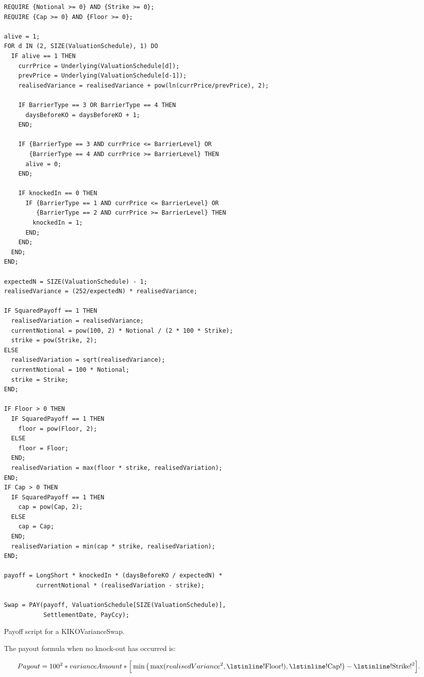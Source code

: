 \begin{listing}[hbt]
\begin{verbatim}
REQUIRE {Notional >= 0} AND {Strike >= 0};
REQUIRE {Cap >= 0} AND {Floor >= 0};

alive = 1;
FOR d IN (2, SIZE(ValuationSchedule), 1) DO
  IF alive == 1 THEN
    currPrice = Underlying(ValuationSchedule[d]);
    prevPrice = Underlying(ValuationSchedule[d-1]);
    realisedVariance = realisedVariance + pow(ln(currPrice/prevPrice), 2);

    IF BarrierType == 3 OR BarrierType == 4 THEN
      daysBeforeKO = daysBeforeKO + 1;
    END;

    IF {BarrierType == 3 AND currPrice <= BarrierLevel} OR
       {BarrierType == 4 AND currPrice >= BarrierLevel} THEN
      alive = 0;
    END;

    IF knockedIn == 0 THEN
      IF {BarrierType == 1 AND currPrice <= BarrierLevel} OR
         {BarrierType == 2 AND currPrice >= BarrierLevel} THEN
        knockedIn = 1;
      END;
    END;
  END;
END;

expectedN = SIZE(ValuationSchedule) - 1;
realisedVariance = (252/expectedN) * realisedVariance;

IF SquaredPayoff == 1 THEN
  realisedVariation = realisedVariance;
  currentNotional = pow(100, 2) * Notional / (2 * 100 * Strike);
  strike = pow(Strike, 2);
ELSE
  realisedVariation = sqrt(realisedVariance);
  currentNotional = 100 * Notional;
  strike = Strike;
END;

IF Floor > 0 THEN
  IF SquaredPayoff == 1 THEN
    floor = pow(Floor, 2);
  ELSE
    floor = Floor;
  END;
  realisedVariation = max(floor * strike, realisedVariation);
END;
IF Cap > 0 THEN
  IF SquaredPayoff == 1 THEN
    cap = pow(Cap, 2);
  ELSE
    cap = Cap;
  END;
  realisedVariation = min(cap * strike, realisedVariation);
END;

payoff = LongShort * knockedIn * (daysBeforeKO / expectedN) *
         currentNotional * (realisedVariation - strike);

Swap = PAY(payoff, ValuationSchedule[SIZE(ValuationSchedule)],
           SettlementDate, PayCcy);
\end{verbatim}
\caption{Payoff script for a KIKOVarianceSwap.}
\label{lst:kiko_variance_swap}
\end{listing}

The payout formula when no knock-out has occurred is:

\begin{equation*}
  Payout = 100^2 * varianceAmount * \Big[ \min \big( \max (realisedVariance^2, \text{\lstinline!Floor!}), \text{\lstinline!Cap!}\big) - \text{\lstinline!Strike!}^2 \Big].
\end{equation*}

